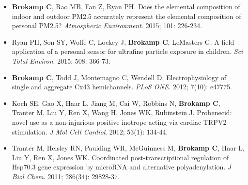 \documentclass[10pt]{res} %
\begin{document}
\begin{resume}
\vspace{15pt} %
\begin{itemize} \itemsep -2pt %
\item \textbf{Brokamp C}, Rao MB, Fan Z, Ryan PH. Does the elemental composition of indoor and outdoor PM2.5 accurately represent the elemental composition of personal PM2.5? \textit{Atmospheric Environment}. 2015; 101: 226-234.
\item Ryan PH, Son SY, Wolfe C, Lockey J, \textbf{Brokamp C}, LeMasters G. A field application of a personal sensor for ultrafine particle exposure in children. \textit{Sci Total Environ}. 2015; 508: 366-73.
\item \textbf{Brokamp C}, Todd J, Montemagno C, Wendell D. Electrophysiology of single and aggregate Cx43 hemichannels. \textit{PLoS ONE}. 2012; 7(10): e47775.
\item Koch SE, Gao X, Haar L, Jiang M, Cai W, Robbins N, \textbf{Brokamp C}, Tranter M, Liu Y, Ren X, Wang H, Jones WK, Rubinstein J. Probenecid: novel use as a non-injurious positive inotrope acting via cardiac TRPV2 stimulation. \textit{J Mol Cell Cardiol}. 2012; 53(1): 134-44.
\item Tranter M, Helsley RN, Paulding WR, McGuinness M, \textbf{Brokamp C}, Haar L, Liu Y, Ren X, Jones WK. Coordinated post-transcriptional regulation of Hsp70.3 gene expression by microRNA and alternative polyadenylation. \textit{J Biol Chem}. 2011; 286(34): 29828-37.
\end{itemize}


\end{resume}
\end{document}
